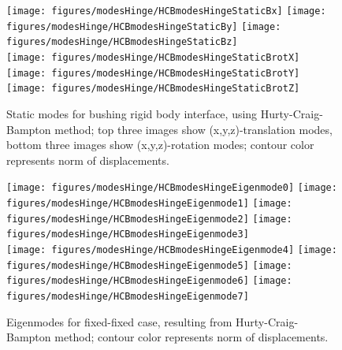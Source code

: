 \begin{figure}[tbph]
  \begin{center}
  \texttt{[image: figures/modesHinge/HCBmodesHingeStaticBx]}
  \texttt{[image: figures/modesHinge/HCBmodesHingeStaticBy]}
  \texttt{[image: figures/modesHinge/HCBmodesHingeStaticBz]}\\
  \texttt{[image: figures/modesHinge/HCBmodesHingeStaticBrotX]}
  \texttt{[image: figures/modesHinge/HCBmodesHingeStaticBrotY]}
  \texttt{[image: figures/modesHinge/HCBmodesHingeStaticBrotZ]}
  \end{center}
  \caption{Static modes for bushing rigid body interface, using Hurty-Craig-Bampton method; top three images show (x,y,z)-translation modes, bottom three images show (x,y,z)-rotation modes; contour color represents norm of displacements.}
  \label{fig_hingePartStaticModesB}
\end{figure}

\begin{figure}[tbph]
  \begin{center}
  \texttt{[image: figures/modesHinge/HCBmodesHingeEigenmode0]}
  \texttt{[image: figures/modesHinge/HCBmodesHingeEigenmode1]}
  \texttt{[image: figures/modesHinge/HCBmodesHingeEigenmode2]}
  \texttt{[image: figures/modesHinge/HCBmodesHingeEigenmode3]}\\
  \texttt{[image: figures/modesHinge/HCBmodesHingeEigenmode4]}
  \texttt{[image: figures/modesHinge/HCBmodesHingeEigenmode5]}
  \texttt{[image: figures/modesHinge/HCBmodesHingeEigenmode6]}
  \texttt{[image: figures/modesHinge/HCBmodesHingeEigenmode7]}
  \end{center}
  \caption{Eigenmodes for fixed-fixed case, resulting from Hurty-Craig-Bampton method; contour color represents norm of displacements.}
  \label{fig_hingePartFixedFixedModes}
\end{figure}


